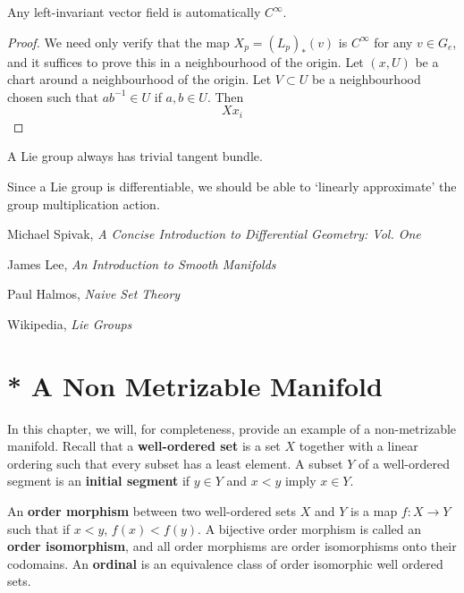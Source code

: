 \begin{theorem}
    Any left-invariant vector field is automatically $C^\infty$.
\end{theorem}
\begin{proof}
    We need only verify that the map $X_p = (L_p)_*(v)$ is $C^\infty$ for any $v \in G_e$, and it suffices to prove this in a neighbourhood of the origin. Let $(x,U)$ be a chart around a neighbourhood of the origin. Let $V \subset U$ be a neighbourhood chosen such that $ab^{-1} \in U$ if $a,b \in U$. Then
    \[ Xx_i \]
\end{proof}

\begin{corollary}
    A Lie group always has trivial tangent bundle.
\end{corollary}

Since a Lie group is differentiable, we should be able to `linearly approximate' the group multiplication action. 

\begin{thebibliography}{10}
     Michael Spivak,
    \emph{A Concise Introduction to Differential Geometry: Vol. One}

     James Lee,
    \emph{An Introduction to Smooth Manifolds}

     Paul Halmos,
    \emph{Naive Set Theory}

     Wikipedia,
    \emph{Lie Groups}
\end{thebibliography}













\section{* A Non Metrizable Manifold}

In this chapter, we will, for completeness, provide an example of a non-metrizable manifold. Recall that a {\bf well-ordered set} is a set $X$ together with a linear ordering such that every subset has a least element. A subset $Y$ of a well-ordered segment is an {\bf initial segment} if $y \in Y$ and $x < y$ imply $x \in Y$.

\begin{definition}
    An {\bf order morphism} between two well-ordered sets $X$ and $Y$ is a map $f:X \to Y$ such that if $x < y$, $f(x) < f(y)$. A bijective order morphism is called an {\bf order isomorphism}, and all order morphisms are order isomorphisms onto their codomains. An {\bf ordinal} is an equivalence class of order isomorphic well ordered sets.
\end{definition}

